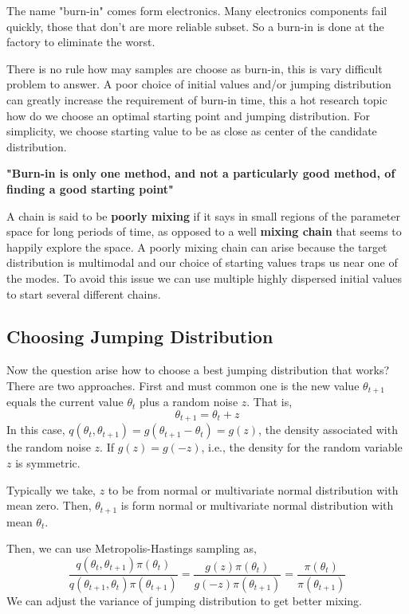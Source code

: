 The name "burn-in" comes form electronics. Many electronics components fail quickly, those that don't are more reliable subset. So a burn-in is done at the factory to eliminate the worst.

There is no rule how may samples are choose as burn-in, this is vary difficult problem to answer. A poor choice of initial values and/or jumping distribution can greatly increase the requirement of burn-in time, this a hot research topic how do we choose an optimal starting point and jumping distribution. For simplicity, we choose starting value to be as close as center of the candidate distribution. 

\textbf{"Burn-in is only one method, and not a particularly good method, of finding a good starting point"}

A chain is said to be \textbf{poorly mixing} if it says in small regions of the parameter
space for long periods of time, as opposed to a well \textbf{mixing chain} that seems to
happily explore the space. A poorly mixing chain can arise because the target
distribution is multimodal and our choice of starting values traps us near one of the modes. 
To avoid this issue we can use multiple highly dispersed initial values to start several different chains.

\subsection{Choosing Jumping Distribution}
Now the question arise how to choose a best jumping distribution that works? 
There are two approaches. First and must common one is the new value $ \theta_{t+1} $ equals the current value $ \theta_t $ plus a random noise $ z $. That is,
\[
    \theta_{t+1} = \theta_t + z
\]
In this case, $ q(\theta_{t},\theta_{t+1}) = g(\theta_{t+1}-\theta_t) = g(z) $, the density associated with the random noise $ z $. If $ g(z) = g(-z) $, i.e., the density for the random variable $ z $ is symmetric.

Typically we take, $ z $ to be from normal or multivariate normal distribution with mean zero. Then, $ \theta_{t+1} $ is form normal or multivariate normal distribution with mean $ \theta_t $. 

Then, we can use Metropolis-Hastings sampling as,
\[
    \frac{q(\theta_t,\theta_{t+1})\pi(\theta_t)}{q(\theta_{t+1},\theta_{t})\pi(\theta_{t+1})}  = \frac{g(z)\pi(\theta_t)}{g(-z)\pi(\theta_{t+1})} = \frac{\pi(\theta_t)}{\pi(\theta_{t+1})}
\]
We can adjust the variance of jumping distribution to get better mixing.

